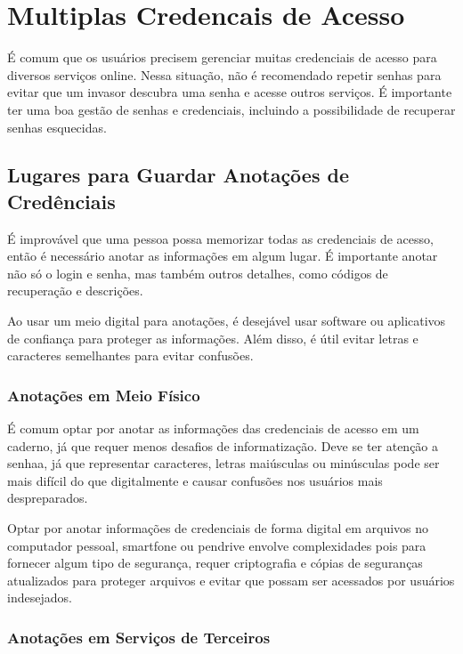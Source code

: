 \documentclass[12pt]{article}
\begin{document}
\section{Multiplas Credencais de Acesso}

É comum que os usuários precisem gerenciar muitas credenciais de acesso
para diversos serviços online.
Nessa situação, não é recomendado repetir senhas para evitar que um invasor
descubra uma senha e acesse outros serviços.
É importante ter uma boa gestão de senhas e credenciais, incluindo a
possibilidade de recuperar senhas esquecidas.

\subsection{Lugares para Guardar Anotações de Credênciais}

É improvável que uma pessoa possa memorizar todas as credenciais de acesso,
então é necessário anotar as informações em algum lugar.
É importante anotar não só o login e senha, mas também outros detalhes,
como códigos de recuperação e descrições.

Ao usar um meio digital para anotações, é desejável usar software ou
aplicativos de confiança para proteger as informações. Além disso, é útil
evitar letras e caracteres semelhantes para evitar confusões.

\subsubsection{Anotações em Meio Físico}

É comum optar por anotar as informações das credenciais de acesso em um
caderno, já que requer menos desafios de informatização.
Deve se ter atenção a senhaa, já que representar caracteres, letras
maiúsculas ou minúsculas pode ser mais difícil do que digitalmente e
causar confusões nos usuários mais despreparados.

Optar por anotar informações de credenciais de forma digital em arquivos
no computador pessoal, smartfone ou pendrive envolve complexidades pois
para fornecer algum tipo de segurança, requer criptografia e cópias de seguranças
atualizados para proteger arquivos e evitar que possam ser acessados por
usuários indesejados.

\subsubsection{Anotações em Serviços de Terceiros}
\end{document}
